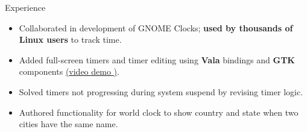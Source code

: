 \documentclass{resume} %
\begin{document}
\begin{workSection}{Experience}
	\experienceItem[
	company=GNOME Foundation,
	location=Remote,
	position=Open-Source Contributor,
	duration=December 2023 {-} June 2024
	]
	\begin{itemize}
	\vspace{-0.5em}
	\itemsep -6pt {}
	\item Collaborated 
	in development of GNOME Clocks; \textbf{used by thousands of Linux users} to track  time.
	\item Added 
	full-screen timers and timer editing using \textbf{Vala} bindings and \textbf{GTK} components \href{https://youtu.be/fDzYWusOLow}{(\underline{video demo \faExternalLink})}. %
	\item Solved timers not progressing during system suspend by revising timer logic. %
	\item Authored functionality for world clock to show country and state when two cities have the same name. %
	\end{itemize}
	

\end{workSection}
\end{document}
